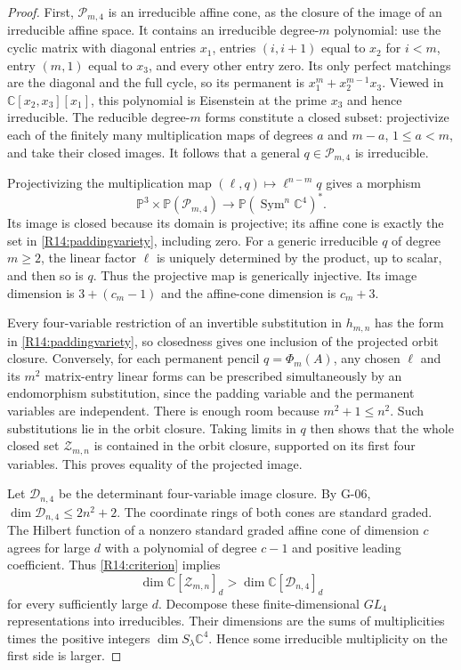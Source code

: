 \begin{proof}
First, $\mathcal P_{m,4}$ is an irreducible affine cone, as the
closure of the image of an irreducible affine space. It contains
an irreducible degree-$m$ polynomial: use the cyclic matrix with
diagonal entries $x_1$, entries $(i,i+1)$ equal to $x_2$ for
$i<m$, entry $(m,1)$ equal to $x_3$, and every other entry zero.
Its only perfect matchings are the diagonal and the full cycle,
so its permanent is $x_1^m+x_2^{m-1}x_3$.
Viewed in $\mathbb C[x_2,x_3][x_1]$, this polynomial is
Eisenstein at the prime $x_3$ and hence irreducible.
The reducible degree-$m$ forms constitute a closed subset:
projectivize each of the finitely many multiplication maps of
degrees $a$ and $m-a$, $1\leq a<m$, and take their closed images.
It follows that a general $q\in\mathcal P_{m,4}$ is irreducible.

Projectivizing the multiplication map
$(\ell,q)\mapsto\ell^{n-m}q$ gives a morphism
\[
 \mathbb P^3\times\mathbb P(\mathcal P_{m,4})
 \longrightarrow\mathbb P(\operatorname{Sym}^n\mathbb C^4)^*.
\]
Its image is closed because its domain is projective; its affine
cone is exactly the set in \eqref{R14:paddingvariety}, including
zero. For a generic irreducible $q$ of degree $m\geq2$, the
linear factor $\ell$ is uniquely determined by the product,
up to scalar, and then so is $q$. Thus the projective map is
generically injective. Its image dimension is
$3+(c_m-1)$ and the affine-cone dimension is $c_m+3$.

Every four-variable restriction of an invertible substitution
in $h_{m,n}$ has the form in \eqref{R14:paddingvariety}, so
closedness gives one inclusion of the projected orbit closure.
Conversely, for each permanent pencil $q=\Phi_m(A)$, any chosen
$\ell$ and its $m^2$ matrix-entry linear forms can be prescribed
simultaneously by an endomorphism substitution, since the
padding variable and the permanent variables are independent.
There is enough room because $m^2+1\leq n^2$.
Such substitutions lie in the orbit closure. Taking limits in
$q$ then shows that the whole closed set $\mathcal Z_{m,n}$ is
contained in the orbit closure, supported on its first four
variables. This proves equality of the projected image.

Let $\mathcal D_{n,4}$ be the determinant four-variable image
closure. By G-06, $\dim\mathcal D_{n,4}\leq2n^2+2$.
The coordinate rings of both cones are standard graded. The
Hilbert function of a nonzero standard graded affine cone of
dimension $c$ agrees for large $d$ with a polynomial of degree
$c-1$ and positive leading coefficient. Thus
\eqref{R14:criterion} implies
\[
 \dim\mathbb C[\mathcal Z_{m,n}]_d
 >\dim\mathbb C[\mathcal D_{n,4}]_d
\]
for every sufficiently large $d$.
Decompose these finite-dimensional $GL_4$ representations into
irreducibles. Their dimensions are the sums of multiplicities
times the positive integers $\dim S_\lambda\mathbb C^4$.
Hence some irreducible multiplicity on the first side is larger.


\end{proof}
